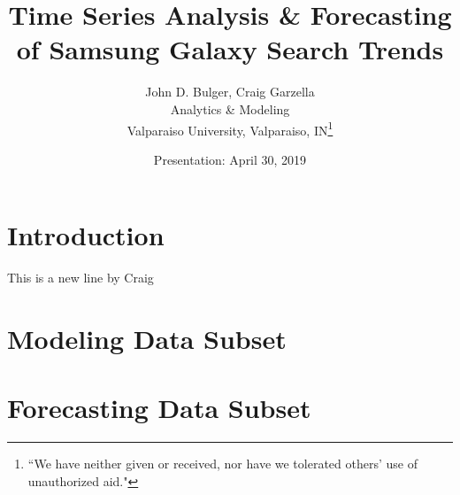 \documentclass[12pt]{article}
\title{Time Series Analysis \& Forecasting of Samsung Galaxy Search Trends}
\author{John D. Bulger, Craig Garzella\\
	Analytics \& Modeling
	\\Valparaiso University, Valparaiso, IN\thanks{``We have neither given or received, nor have we tolerated others' use of unauthorized aid."}}
\date{Presentation: April 30, 2019}
\begin{document}
	\maketitle
	
	\section{Introduction}
	
	This is a new line by Craig 
	

\newpage
\begin{thebibliography}{3}
	
	
\end{thebibliography}

\newpage
\begin{appendices}	
	\section{Modeling Data Subset}
	
\newpage

	\section{Forecasting Data Subset}

\end{appendices}
\end{document}
